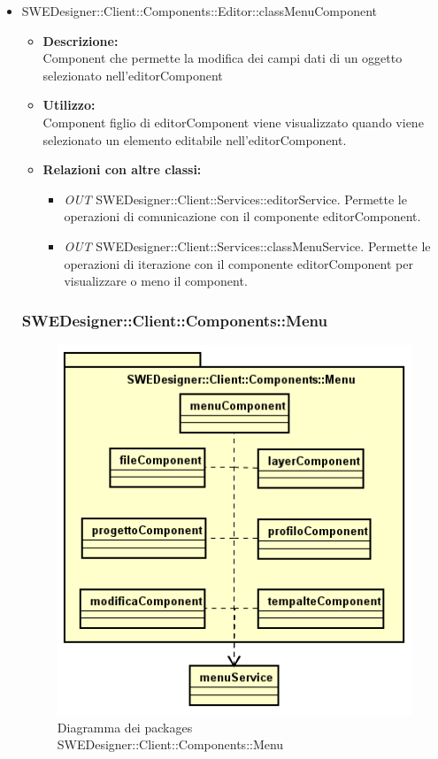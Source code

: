 \begin{itemize}
			\item SWEDesigner::Client::Components::Editor::classMenuComponent
			\begin{itemize}
			\item \textbf{Descrizione: }\\
			Component che permette la modifica dei campi dati di un oggetto selezionato nell'editorComponent
			\item \textbf{Utilizzo: }\\
			Component figlio di editorComponent viene visualizzato quando viene selezionato un elemento editabile nell'editorComponent.
			\item \textbf{Relazioni con altre classi: }
			\begin{itemize}
			\item \emph{OUT} SWEDesigner::Client::Services::editorService. Permette le operazioni di comunicazione con il componente editorComponent.
			\item \emph{OUT} SWEDesigner::Client::Services::classMenuService. Permette le operazioni di iterazione con il componente editorComponent per visualizzare o meno il component.
			\end{itemize}
			\end{itemize}						
			
			\subsubsection{SWEDesigner::Client::Components::Menu}
		 \begin{figure}[h!]
		\centering
		\includegraphics[scale=0.8]{Disegnetti/SWEDesigner__Client__Components__menu.png}
		\caption{Diagramma dei packages SWEDesigner::Client::Components::Menu}
 		\end{figure}

\end{itemize}
